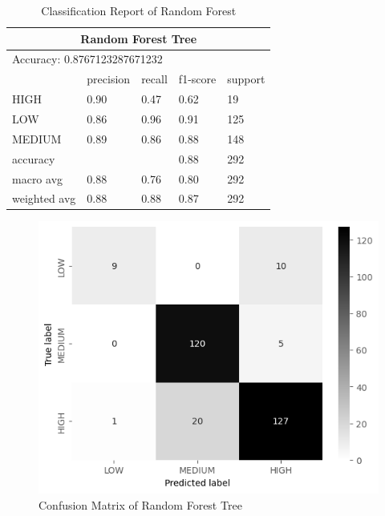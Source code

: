 \begin{table}[H]  \centering  
    \begin{tabular}{@{}lllll@{}}
    \toprule
    \multicolumn{5}{c}{Random Forest Tree}                 \\ \midrule
    \multicolumn{5}{l}{Accuracy: 0.8767123287671232}       \\\midrule
                 & precision & recall & f1-score & support \\
    HIGH         & 0.90      & 0.47   & 0.62     & 19      \\ 
    LOW          & 0.86      & 0.96   & 0.91     & 125     \\
    MEDIUM       & 0.89      & 0.86   & 0.88     & 148     \\
    accuracy     &           &        & 0.88     & 292     \\
    macro avg    & 0.88      & 0.76   & 0.80     & 292     \\
    weighted avg & 0.88      & 0.88   & 0.87     & 292     \\ \bottomrule
    \end{tabular}
    \caption{Classification Report of Random Forest}
    \label{tableRFT}
\end{table}


\begin{figure}[H]
    \includegraphics[scale=0.7]{imgs/rft_cm.png}
    \centering
    \caption{Confusion Matrix of Random Forest Tree}
    \label{cmRFT}
\end{figure}


